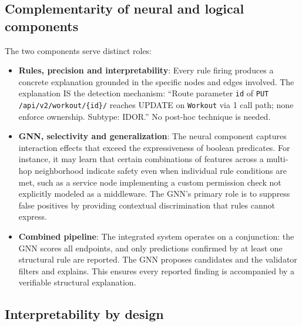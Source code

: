 \subsection{Complementarity of neural and logical components}
\label{sec:det-complement}

The two components serve distinct roles:
\begin{itemize}
    \item \textbf{Rules, precision and interpretability}: Every rule
    firing produces a concrete explanation grounded in the specific nodes and
    edges involved. The explanation IS the detection mechanism: ``Route
    parameter \texttt{id} of \texttt{PUT /api/v2/workout/\{id\}/} reaches
    UPDATE on \texttt{Workout} via 1 call path; none enforce ownership.
    Subtype: IDOR.'' No post-hoc technique is needed.

    \item \textbf{GNN, selectivity and generalization}: The neural
    component captures interaction effects that exceed the expressiveness of
    boolean predicates. For instance, it may learn that certain combinations
    of features across a multi-hop neighborhood indicate safety even when
    individual rule conditions are met, such as a service node implementing
    a custom permission check not explicitly modeled as a middleware.
    The GNN's primary role is to suppress false positives by providing
    contextual discrimination that rules cannot express.

    \item \textbf{Combined pipeline}: The integrated system operates on a
    conjunction: the GNN scores all endpoints, and only predictions confirmed
    by at least one structural rule are reported. The GNN proposes candidates
    and the validator filters and explains. This ensures every reported
    finding is accompanied by a verifiable structural explanation.
\end{itemize}

\subsection{Interpretability by design}
\label{sec:det-interp}

